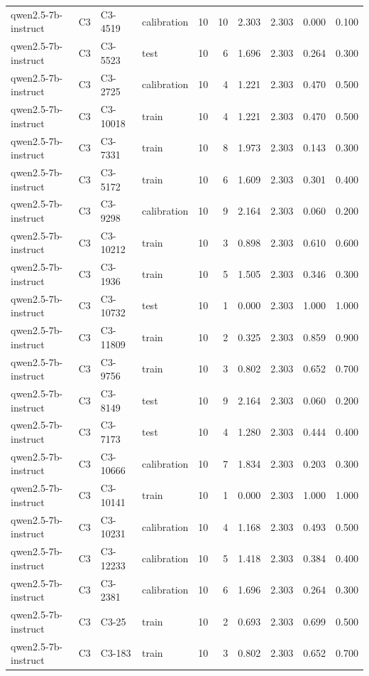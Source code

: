 \begin{table}
\begin{tabular}{llllrrrrrr}
qwen2.5-7b-instruct & C3 & C3-4519 & calibration & 10 & 10 & 2.303 & 2.303 & 0.000 & 0.100 \\
qwen2.5-7b-instruct & C3 & C3-5523 & test & 10 & 6 & 1.696 & 2.303 & 0.264 & 0.300 \\
qwen2.5-7b-instruct & C3 & C3-2725 & calibration & 10 & 4 & 1.221 & 2.303 & 0.470 & 0.500 \\
qwen2.5-7b-instruct & C3 & C3-10018 & train & 10 & 4 & 1.221 & 2.303 & 0.470 & 0.500 \\
qwen2.5-7b-instruct & C3 & C3-7331 & train & 10 & 8 & 1.973 & 2.303 & 0.143 & 0.300 \\
qwen2.5-7b-instruct & C3 & C3-5172 & train & 10 & 6 & 1.609 & 2.303 & 0.301 & 0.400 \\
qwen2.5-7b-instruct & C3 & C3-9298 & calibration & 10 & 9 & 2.164 & 2.303 & 0.060 & 0.200 \\
qwen2.5-7b-instruct & C3 & C3-10212 & train & 10 & 3 & 0.898 & 2.303 & 0.610 & 0.600 \\
qwen2.5-7b-instruct & C3 & C3-1936 & train & 10 & 5 & 1.505 & 2.303 & 0.346 & 0.300 \\
qwen2.5-7b-instruct & C3 & C3-10732 & test & 10 & 1 & 0.000 & 2.303 & 1.000 & 1.000 \\
qwen2.5-7b-instruct & C3 & C3-11809 & train & 10 & 2 & 0.325 & 2.303 & 0.859 & 0.900 \\
qwen2.5-7b-instruct & C3 & C3-9756 & train & 10 & 3 & 0.802 & 2.303 & 0.652 & 0.700 \\
qwen2.5-7b-instruct & C3 & C3-8149 & test & 10 & 9 & 2.164 & 2.303 & 0.060 & 0.200 \\
qwen2.5-7b-instruct & C3 & C3-7173 & test & 10 & 4 & 1.280 & 2.303 & 0.444 & 0.400 \\
qwen2.5-7b-instruct & C3 & C3-10666 & calibration & 10 & 7 & 1.834 & 2.303 & 0.203 & 0.300 \\
qwen2.5-7b-instruct & C3 & C3-10141 & train & 10 & 1 & 0.000 & 2.303 & 1.000 & 1.000 \\
qwen2.5-7b-instruct & C3 & C3-10231 & calibration & 10 & 4 & 1.168 & 2.303 & 0.493 & 0.500 \\
qwen2.5-7b-instruct & C3 & C3-12233 & calibration & 10 & 5 & 1.418 & 2.303 & 0.384 & 0.400 \\
qwen2.5-7b-instruct & C3 & C3-2381 & calibration & 10 & 6 & 1.696 & 2.303 & 0.264 & 0.300 \\
qwen2.5-7b-instruct & C3 & C3-25 & train & 10 & 2 & 0.693 & 2.303 & 0.699 & 0.500 \\
qwen2.5-7b-instruct & C3 & C3-183 & train & 10 & 3 & 0.802 & 2.303 & 0.652 & 0.700 \\

\end{tabular}
\end{table}
